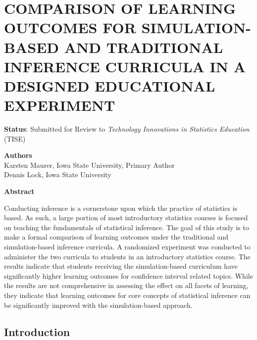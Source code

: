 \chapter{COMPARISON OF LEARNING OUTCOMES FOR SIMULATION-BASED AND TRADITIONAL INFERENCE CURRICULA IN A DESIGNED EDUCATIONAL EXPERIMENT}
\label{CurriculumStudy}
 
 
\begin{center}
\textbf{Status}: Submitted for Review to \textit{Technology Innovations in Statistics Education} (TISE)\\
\end{center} 

\begin{center}
\textbf{Authors}\\
Karsten Maurer, Iowa State University, Primary Author\\
Dennis Lock, Iowa State University
\end{center}


\begin{center}
\textbf{Abstract}\\
\end{center}

Conducting inference is a cornerstone upon which the practice of statistics is based. As such, a large portion of most introductory statistics courses is focused on teaching the fundamentals of statistical inference. The goal of this study is to make a formal comparison of learning outcomes under the traditional and simulation-based inference curricula. A randomized experiment was conducted to administer the two curricula to students in an introductory statistics course.  The results indicate that students receiving the simulation-based curriculum have significantly higher learning outcomes for confidence interval related topics. While the results are not comprehensive in assessing the effect on all facets of learning, they indicate that learning outcomes for core concepts of statistical inference can be significantly improved with the simulation-based approach. 



\section{Introduction}
\label{intro}

